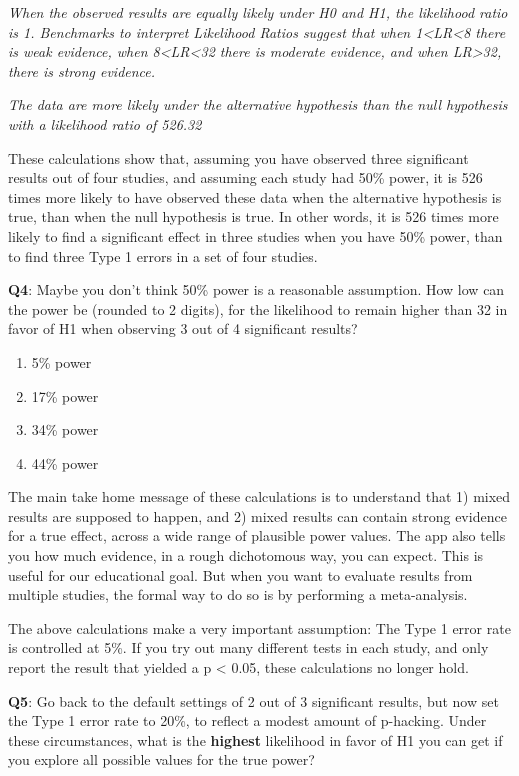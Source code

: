 \documentclass[
]{krantz}
\providecommand{\tightlist}{%
  \setlength{\itemsep}{0pt}\setlength{\parskip}{0pt}}
\begin{document}
\emph{When the observed results are equally likely under H0 and H1, the likelihood ratio is 1. Benchmarks to interpret Likelihood Ratios suggest that when 1\textless LR\textless8 there is weak evidence, when 8\textless LR\textless32 there is moderate evidence, and when LR\textgreater32, there is strong evidence.}

\emph{The data are more likely under the alternative hypothesis than the null hypothesis with a likelihood ratio of 526.32}

These calculations show that, assuming you have observed three significant results out of four studies, and assuming each study had 50\% power, it is 526 times more likely to have observed these data when the alternative hypothesis is true, than when the null hypothesis is true. In other words, it is 526 times more likely to find a significant effect in three studies when you have 50\% power, than to find three Type 1 errors in a set of four studies.

\textbf{Q4}: Maybe you don't think 50\% power is a reasonable assumption. How low can the power be (rounded to 2 digits), for the likelihood to remain higher than 32 in favor of H1 when observing 3 out of 4 significant results?

\begin{enumerate}
\def\labelenumi{\Alph{enumi})}
\tightlist
\item
  5\% power
\item
  17\% power
\item
  34\% power
\item
  44\% power
\end{enumerate}

The main take home message of these calculations is to understand that 1) mixed results are supposed to happen, and 2) mixed results can contain strong evidence for a true effect, across a wide range of plausible power values. The app also tells you how much evidence, in a rough dichotomous way, you can expect. This is useful for our educational goal. But when you want to evaluate results from multiple studies, the formal way to do so is by performing a meta-analysis.

The above calculations make a very important assumption: The Type 1 error rate is controlled at 5\%. If you try out many different tests in each study, and only report the result that yielded a p \textless{} 0.05, these calculations no longer hold.

\textbf{Q5}: Go back to the default settings of 2 out of 3 significant results, but now set the Type 1 error rate to 20\%, to reflect a modest amount of p-hacking. Under these circumstances, what is the \textbf{highest} likelihood in favor of H1 you can get if you explore all possible values for the true power?
\end{document}

